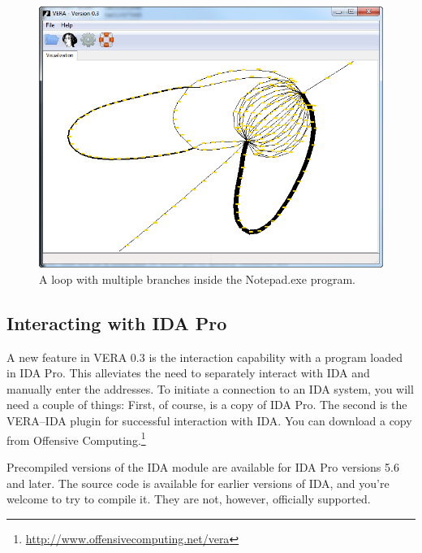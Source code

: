 \documentclass[11pt]{article}
\begin{document}
\begin{figure}[htb]
  \centering
  \includegraphics[width=5.0in]{vera-notepad-trace-zoom2.png}
  \caption{A loop with multiple branches inside the Notepad.exe program.}\label{fig:notepad-loop}
\end{figure}

\subsection{Interacting with IDA Pro}

A new feature in VERA 0.3 is the interaction capability with a program
loaded in IDA Pro. This alleviates the need to separately interact
with IDA and manually enter the addresses. To initiate a connection
to an IDA system, you will need a couple of things: First, of course,
is a copy of IDA Pro. The second is the VERA--IDA plugin for successful interaction with IDA. You can download a copy from
Offensive Computing.\footnote{\url{http://www.offensivecomputing.net/vera}}

Precompiled versions of the IDA module are available for IDA Pro versions 5.6 and later. The source code is available for earlier
versions of IDA, and you're welcome to try to compile it. They are
not, however, officially supported.
\end{document}
